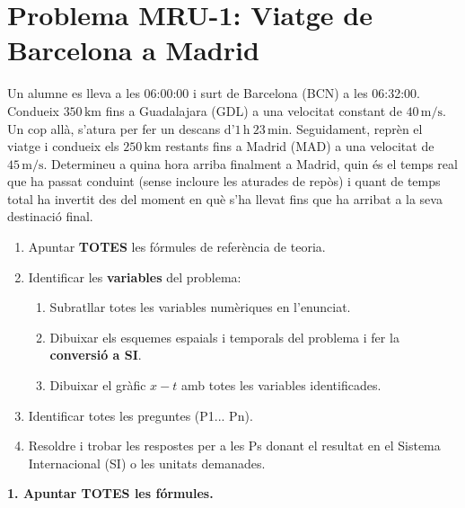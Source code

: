 \documentclass[12pt,a4paper]{article}
\begin{document}
{\color{black}

\section*{Problema MRU-1: Viatge de Barcelona a Madrid}

Un alumne es lleva a les 06:00:00 i surt de Barcelona (BCN) a les 06:32:00. Condueix $350\,\text{km}$ fins a Guadalajara (GDL) a una velocitat constant de $40\,\text{m/s}$. Un cop allà, s'atura per fer un descans d'$1\,\text{h}\ 23\,\text{min}$. Seguidament, reprèn el viatge i condueix els $250\,\text{km}$ restants fins a Madrid (MAD) a una velocitat de $45\,\text{m/s}$. Determineu a quina hora arriba finalment a Madrid, quin és el temps real que ha passat conduint (sense incloure les aturades de repòs) i quant de temps total ha invertit des del moment en què s'ha llevat fins que ha arribat a la seva destinació final.

\vspace{0.5cm}

\begin{tcolorbox}[title=Passos a seguir per a qualsevol problema de MRU:,colframe=black,colback=black!5,sharp corners=south,fontupper=\color{black}]
\begin{enumerate}
    \item Apuntar \textbf{TOTES} les fórmules de referència de teoria.
    \item Identificar les \textbf{variables} del problema:
    \begin{enumerate}[label=2.\arabic*]
        \item Subratllar totes les variables numèriques en l'enunciat.
        \item Dibuixar els esquemes espaials i temporals del problema i fer la \textbf{conversió a SI}.
        \item Dibuixar el gràfic $x-t$ amb totes les variables identificades.
    \end{enumerate}
    \item Identificar totes les preguntes (P1... Pn).
    \item Resoldre i trobar les respostes per a les Ps donant el resultat en el Sistema Internacional (SI) o les unitats demanades.
\end{enumerate}
\end{tcolorbox}
}

\vspace{0.5cm}

{\color{black}\textbf{\large 1. Apuntar TOTES les fórmules.}}
\end{document}
